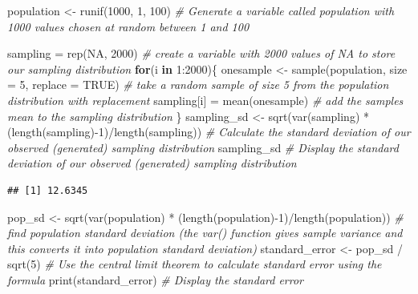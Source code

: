 \documentclass[
]{book}
\newenvironment{Shaded}{\begin{snugshade}}{\end{snugshade}}
\newcommand{\AttributeTok}[1]{\textcolor[rgb]{0.77,0.63,0.00}{#1}}
\newcommand{\CommentTok}[1]{\textcolor[rgb]{0.56,0.35,0.01}{\textit{#1}}}
\newcommand{\ConstantTok}[1]{\textcolor[rgb]{0.00,0.00,0.00}{#1}}
\newcommand{\ControlFlowTok}[1]{\textcolor[rgb]{0.13,0.29,0.53}{\textbf{#1}}}
\newcommand{\DecValTok}[1]{\textcolor[rgb]{0.00,0.00,0.81}{#1}}
\newcommand{\FunctionTok}[1]{\textcolor[rgb]{0.00,0.00,0.00}{#1}}
\newcommand{\NormalTok}[1]{#1}
\newcommand{\OtherTok}[1]{\textcolor[rgb]{0.56,0.35,0.01}{#1}}
\newcommand{\SpecialCharTok}[1]{\textcolor[rgb]{0.00,0.00,0.00}{#1}}
\begin{document}
\begin{Shaded}
\begin{Highlighting}[]
\NormalTok{population }\OtherTok{\textless{}{-}} \FunctionTok{runif}\NormalTok{(}\DecValTok{1000}\NormalTok{, }\DecValTok{1}\NormalTok{, }\DecValTok{100}\NormalTok{) }\CommentTok{\# Generate a variable called \textquotesingle{}population\textquotesingle{} with 1000 values chosen at random between 1 and 100}

\NormalTok{sampling }\OtherTok{=} \FunctionTok{rep}\NormalTok{(}\ConstantTok{NA}\NormalTok{, }\DecValTok{2000}\NormalTok{) }\CommentTok{\# create a variable with 2000 values of NA to store our sampling distribution}
\ControlFlowTok{for}\NormalTok{(i }\ControlFlowTok{in} \DecValTok{1}\SpecialCharTok{:}\DecValTok{2000}\NormalTok{)\{}
\NormalTok{  onesample }\OtherTok{\textless{}{-}} \FunctionTok{sample}\NormalTok{(population, }\AttributeTok{size =} \DecValTok{5}\NormalTok{, }\AttributeTok{replace =} \ConstantTok{TRUE}\NormalTok{) }\CommentTok{\# take a random sample of size 5 from the population distribution with replacement  }
\NormalTok{  sampling[i] }\OtherTok{=} \FunctionTok{mean}\NormalTok{(onesample) }\CommentTok{\# add the sample\textquotesingle{}s mean to the sampling distribution}
\NormalTok{\}}
\NormalTok{sampling\_sd }\OtherTok{\textless{}{-}} \FunctionTok{sqrt}\NormalTok{(}\FunctionTok{var}\NormalTok{(sampling) }\SpecialCharTok{*}\NormalTok{ (}\FunctionTok{length}\NormalTok{(sampling)}\SpecialCharTok{{-}}\DecValTok{1}\NormalTok{)}\SpecialCharTok{/}\FunctionTok{length}\NormalTok{(sampling)) }\CommentTok{\# Calculate the standard deviation of our observed (generated) sampling distribution}
\NormalTok{sampling\_sd }\CommentTok{\# Display the standard deviation of our observed (generated) sampling distribution}
\end{Highlighting}
\end{Shaded}

\begin{verbatim}
## [1] 12.6345
\end{verbatim}

\begin{Shaded}
\begin{Highlighting}[]
\NormalTok{pop\_sd }\OtherTok{\textless{}{-}} \FunctionTok{sqrt}\NormalTok{(}\FunctionTok{var}\NormalTok{(population) }\SpecialCharTok{*}\NormalTok{ (}\FunctionTok{length}\NormalTok{(population)}\SpecialCharTok{{-}}\DecValTok{1}\NormalTok{)}\SpecialCharTok{/}\FunctionTok{length}\NormalTok{(population)) }\CommentTok{\# find population standard deviation (the var() function gives sample variance and this converts it into population standard deviation)}
\NormalTok{standard\_error }\OtherTok{\textless{}{-}}\NormalTok{ pop\_sd }\SpecialCharTok{/} \FunctionTok{sqrt}\NormalTok{(}\DecValTok{5}\NormalTok{) }\CommentTok{\# Use the central limit theorem to calculate standard error using the formula}
\FunctionTok{print}\NormalTok{(standard\_error) }\CommentTok{\# Display the standard error}
\end{Highlighting}
\end{Shaded}
\end{document}
